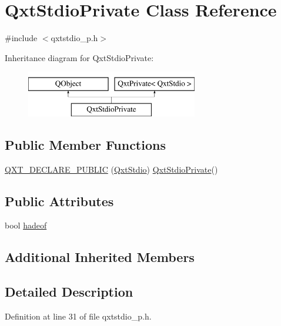 \hypertarget{class_qxt_stdio_private}{\section{Qxt\-Stdio\-Private Class Reference}
\label{class_qxt_stdio_private}
}


{\ttfamily \#include $<$qxtstdio\-\_\-p.\-h$>$}

Inheritance diagram for Qxt\-Stdio\-Private\-:\begin{figure}[H]
\begin{center}
\leavevmode
\includegraphics[height=2.000000cm]{class_qxt_stdio_private}
\end{center}
\end{figure}
\subsection*{Public Member Functions}
\begin{DoxyCompactItemize}
\item 
\hyperlink{class_qxt_stdio_private_acec7a9746daf186efd52762d26044047}{Q\-X\-T\-\_\-\-D\-E\-C\-L\-A\-R\-E\-\_\-\-P\-U\-B\-L\-I\-C} (\hyperlink{class_qxt_stdio}{Qxt\-Stdio}) \hyperlink{class_qxt_stdio_private}{Qxt\-Stdio\-Private}()
\end{DoxyCompactItemize}
\subsection*{Public Attributes}
\begin{DoxyCompactItemize}
\item 
bool \hyperlink{class_qxt_stdio_private_aeecbd1bdbffe2894382a942755b09d92}{hadeof}
\end{DoxyCompactItemize}
\subsection*{Additional Inherited Members}


\subsection{Detailed Description}


Definition at line 31 of file qxtstdio\-\_\-p.\-h.




